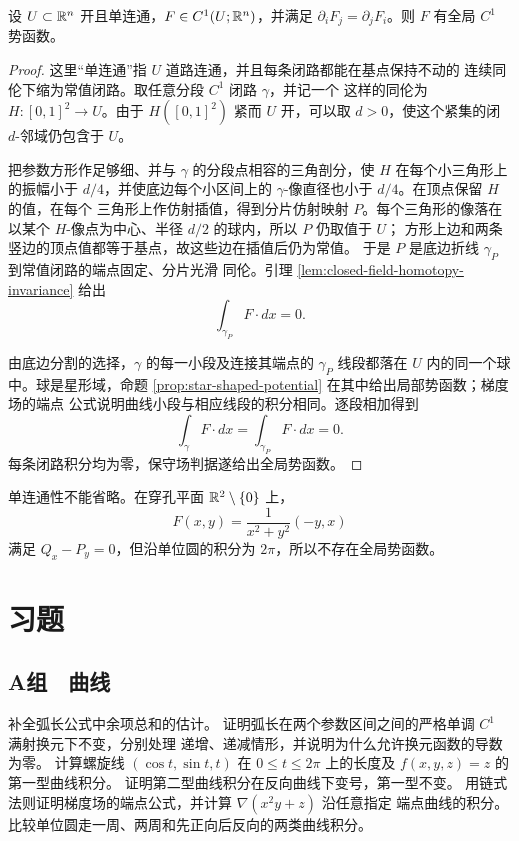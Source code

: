 \begin{theorem}[单连通域上的势函数]
\label{thm:simply-connected-curl-free-potential}
设 \(U\subset\mathbb{R}^n\) 开且单连通，\(F\in C^1(U;\mathbb{R}^n)\)，并满足
\(\partial_iF_j=\partial_jF_i\)。则 \(F\) 有全局 \(C^1\) 势函数。
\end{theorem}

\begin{proof}
这里“单连通”指 \(U\) 道路连通，并且每条闭路都能在基点保持不动的
连续同伦下缩为常值闭路。取任意分段 \(C^1\) 闭路 \(\gamma\)，并记一个
这样的同伦为 \(H:[0,1]^2\to U\)。由于 \(H([0,1]^2)\) 紧而 \(U\)
开，可以取 \(d>0\)，使这个紧集的闭 \(d\)-邻域仍包含于 \(U\)。

把参数方形作足够细、并与 \(\gamma\) 的分段点相容的三角剖分，使 \(H\)
在每个小三角形上的振幅小于 \(d/4\)，并使底边每个小区间上的
\(\gamma\)-像直径也小于 \(d/4\)。在顶点保留 \(H\) 的值，在每个
三角形上作仿射插值，得到分片仿射映射 \(P\)。每个三角形的像落在以某个
\(H\)-像点为中心、半径 \(d/2\) 的球内，所以 \(P\) 仍取值于 \(U\)；
方形上边和两条竖边的顶点值都等于基点，故这些边在插值后仍为常值。
于是 \(P\) 是底边折线 \(\gamma_P\) 到常值闭路的端点固定、分片光滑
同伦。引理 \ref{lem:closed-field-homotopy-invariance} 给出
\[
 \int_{\gamma_P}F\cdot dx=0.
\]

由底边分割的选择，\(\gamma\) 的每一小段及连接其端点的
\(\gamma_P\) 线段都落在 \(U\) 内的同一个球中。球是星形域，命题
\ref{prop:star-shaped-potential} 在其中给出局部势函数；梯度场的端点
公式说明曲线小段与相应线段的积分相同。逐段相加得到
\[
 \int_\gamma F\cdot dx=\int_{\gamma_P}F\cdot dx=0.
\]
每条闭路积分均为零，保守场判据遂给出全局势函数。
\end{proof}

单连通性不能省略。在穿孔平面 \(\mathbb{R}^2\setminus\{0\}\) 上，
\[
 F(x,y)=\frac{1}{x^2+y^2}(-y,x)
\]
满足 \(Q_x-P_y=0\)，但沿单位圆的积分为 \(2\pi\)，所以不存在全局势函数。

\section*{习题}
\subsection*{A组　曲线}
\begin{enumerate}[label=\textbf{\thechapter.\arabic*.}]
 补全弧长公式中余项总和的估计。
 证明弧长在两个参数区间之间的严格单调 $C^1$ 满射换元下不变，分别处理
 递增、递减情形，并说明为什么允许换元函数的导数为零。
 计算螺旋线 $(\cos t,\sin t,t)$ 在 $0\le t\le2\pi$ 上的长度及
 $f(x,y,z)=z$ 的第一型曲线积分。
 证明第二型曲线积分在反向曲线下变号，第一型不变。
 用链式法则证明梯度场的端点公式，并计算 $\nabla(x^2y+z)$ 沿任意指定
 端点曲线的积分。
 比较单位圆走一周、两周和先正向后反向的两类曲线积分。
\end{enumerate}
